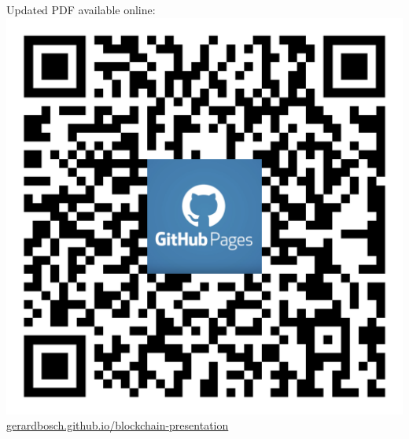 \documentclass[notitlepage, usenames,dvipsnames]{beamer}
\begin{document}
\begin{frame}
\begin{columns}
            \centering
            Updated PDF available online: \\
            \includegraphics[scale=0.06]{../img/online-pdf-qr.png} \\
            \tiny \href{https://gerardbosch.github.io/blockchain-presentation/}{gerardbosch.github.io/blockchain-presentation}
        
        \end{columns}


    \end{frame}
\end{document}
